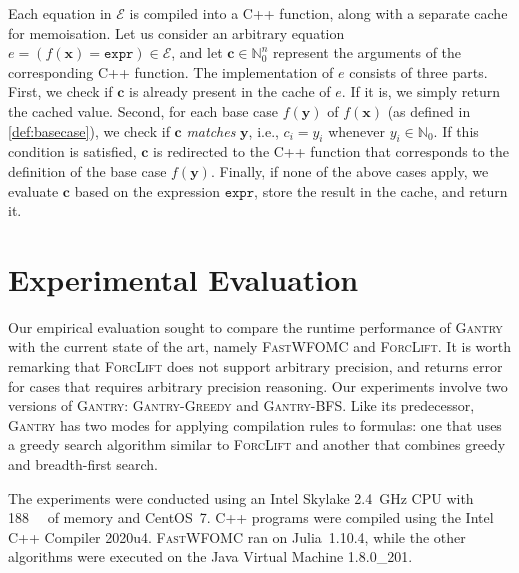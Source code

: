 \documentclass[letterpaper]{article} %
\theoremstyle{remark}
\theoremstyle{definition}
\newcommand{\expr}{\mathtt{expr}}
\newcommand{\Cranetwo}{\textsc{Gantry}}
\newcommand{\Cranebfs}{\textsc{Gantry-BFS}}
\newcommand{\Cranegreedy}{\textsc{Gantry-Greedy}}
\begin{document}
Each equation in $\mathcal{E}$ is compiled into a C++ function, along with a
separate cache for memoisation. Let us consider an arbitrary equation
$e = (f(\mathbf{x}) = \expr{}) \in \mathcal{E}$, and let
$\mathbf{c} \in \mathbb{N}_{0}^{n}$ represent the arguments of the corresponding
C++ function. The implementation of $e$ consists of three parts. First, we check
if $\mathbf{c}$ is already present in the cache of $e$. If it is, we simply
return the cached value. Second, for each base case $f(\mathbf{y})$ of
$f(\mathbf{x})$ (as defined in \cref{def:basecase}), we check if $\mathbf{c}$
\emph{matches} $\mathbf{y}$, i.e., $c_{i} = y_{i}$ whenever
$y_{i} \in \mathbb{N}_{0}$. If this condition is satisfied, $\mathbf{c}$ is
redirected to the C++ function that corresponds to the definition of the base
case $f(\mathbf{y})$. Finally, if none of the above cases apply, we evaluate
$\mathbf{c}$ based on the expression $\expr{}$, store the result in the cache,
and return it.

\section{Experimental Evaluation}\label{sec:experiments}




Our empirical evaluation sought to compare the runtime performance of {\Cranetwo} with the current state of the art, namely 
\textsc{FastWFOMC} and \textsc{ForcLift}. It is worth remarking that  \textsc{ForcLift} does not support arbitrary precision, and returns error for cases that requires arbitrary precision reasoning. 
Our experiments involve two versions
of \Cranetwo{}: \Cranegreedy{} and \Cranebfs{}. Like its predecessor,
\Cranetwo{} has two modes for applying compilation rules to formulas: one that
uses a greedy search algorithm similar to \textsc{ForcLift} and another that
combines greedy and breadth-first search.

The experiments were conducted using an Intel Skylake \SI{2.4}{\giga\hertz} CPU
with \SI{188}{\gibi\byte} of memory and CentOS~7. C++ programs were compiled
using the Intel C++ Compiler 2020u4. \textsc{FastWFOMC} ran on Julia~1.10.4,
while the other algorithms were executed on the Java Virtual Machine 1.8.0\_201.
\end{document}
